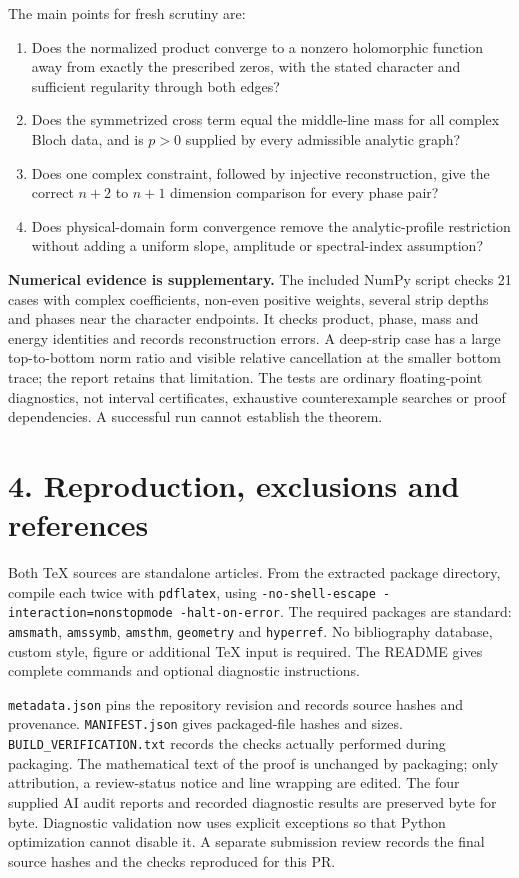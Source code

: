 \documentclass[11pt]{article}
\begin{document}
The main points for fresh scrutiny are:
\begin{enumerate}
\item Does the normalized product converge to a nonzero holomorphic
function away from exactly the prescribed zeros, with the stated
character and sufficient regularity through both edges?
\item Does the symmetrized cross term equal the middle-line mass for all
complex Bloch data, and is $p>0$ supplied by every admissible analytic graph?
\item Does one complex constraint, followed by injective reconstruction,
give the correct $n+2$ to $n+1$ dimension comparison for every phase pair?
\item Does physical-domain form convergence remove the analytic-profile
restriction without adding a uniform slope, amplitude or spectral-index
assumption?
\end{enumerate}

\textbf{Numerical evidence is supplementary.} The included NumPy script
checks 21 cases with complex coefficients, non-even positive weights,
several strip depths and phases near the character endpoints. It checks
product, phase, mass and energy identities and records reconstruction
errors. A deep-strip case has a large top-to-bottom norm ratio and visible
relative cancellation at the smaller bottom trace; the report retains
that limitation. The tests are ordinary floating-point diagnostics,
not interval certificates, exhaustive counterexample searches or proof
dependencies. A successful run cannot establish the theorem.

\newpage
\section*{4. Reproduction, exclusions and references}
Both TeX sources are standalone articles. From the extracted package
directory, compile each twice with \texttt{pdflatex}, using
\texttt{-no-shell-escape -interaction=nonstopmode -halt-on-error}.
The required packages are standard: \texttt{amsmath}, \texttt{amssymb},
\texttt{amsthm}, \texttt{geometry} and \texttt{hyperref}. No bibliography
database, custom style, figure or additional TeX input is required.
The README gives complete commands and optional diagnostic instructions.

\texttt{metadata.json} pins the repository revision and records source
hashes and provenance. \texttt{MANIFEST.json} gives packaged-file hashes
and sizes. \texttt{BUILD\_VERIFICATION.txt} records the checks actually
performed during packaging. The mathematical text of the proof is unchanged
by packaging; only attribution, a review-status notice and line wrapping
are edited.
The four supplied AI audit reports and recorded diagnostic results are
preserved byte for byte. Diagnostic validation now uses explicit exceptions
so that Python optimization cannot disable it. A separate submission review
records the final source hashes and the checks reproduced for this PR.
\end{document}
